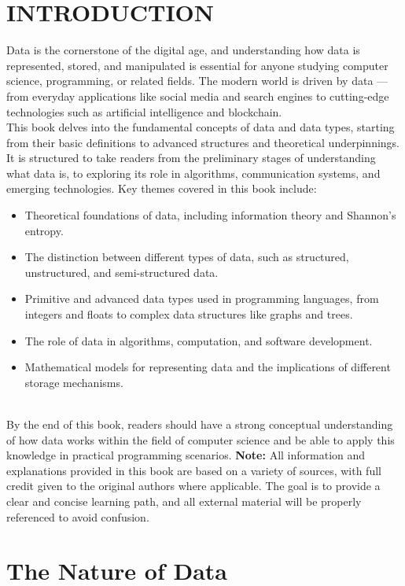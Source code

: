 \documentclass[12pt, oneside]{book}
\begin{document}
\chapter{INTRODUCTION}
Data is the cornerstone of the digital age, and understanding how data is represented, stored, and manipulated is essential for anyone studying computer science, programming, or related fields. The modern world is driven by data — from everyday applications like social media and search engines to cutting-edge technologies such as artificial intelligence and blockchain.\\This book delves into the fundamental concepts of data and data types, starting from their basic definitions to advanced structures and theoretical underpinnings. It is structured to take readers from the preliminary stages of understanding what data is, to exploring its role in algorithms, communication systems, and emerging technologies.
Key themes covered in this book include:
\begin{itemize}
	\item Theoretical foundations of data, including information theory and Shannon's entropy.
	\item The distinction between different types of data, such as structured, unstructured, and semi-structured data.
	\item Primitive and advanced data types used in programming languages, from integers and floats to complex data structures like graphs and trees.
	\item The role of data in algorithms, computation, and software development.
	\item Mathematical models for representing data and the implications of different storage mechanisms.
\end{itemize}\\
By the end of this book, readers should have a strong conceptual understanding of how data works within the field of computer science and be able to apply this knowledge in practical programming scenarios.\vspace{0.5cm}
\textbf{Note:} All information and explanations provided in this book are based on a variety of sources, with full credit given to the original authors where applicable. The goal is to provide a clear and concise learning path, and all external material will be properly referenced to avoid confusion.

\chapter{The Nature of Data}
\end{document}
